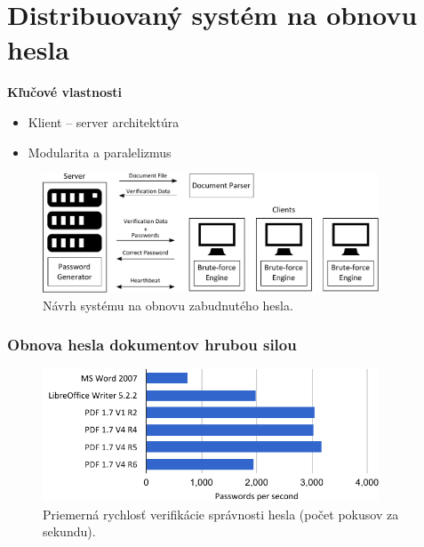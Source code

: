\documentclass[xcolor=dvipsnames]{beamer}
\def\itemtitle#1{{\bfseries#1\smallskip}}
\begin{document}

\section{Distribuovaný systém na obnovu hesla}
\begin{frame}
	\itemtitle{Kľučové vlastnosti}
	\begin{itemize}
		\item Klient -- server architektúra
		\item Modularita a paralelizmus
	\end{itemize}
	\bigskip
	\begin{figure}[h]
		\centering
		\includegraphics[width=100mm]{images/ddpbf_design.pdf} \\	
		\bigskip
		\scriptsize{Návrh systému na obnovu zabudnutého hesla.}	
	\end{figure}
\end{frame}


\begin{frame}
	\frametitle{Obnova hesla dokumentov hrubou silou}
	
	\begin{figure}[h]
		\centering
		\includegraphics[width=100mm]{images/average_speed.pdf} \\	
		\bigskip
		\scriptsize{Priemerná rychlosť verifikácie správnosti hesla (počet pokusov za sekundu).}	
	\end{figure}
\end{frame}

\end{document}
